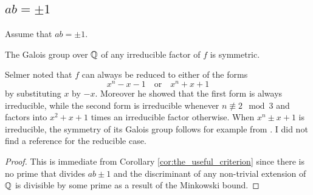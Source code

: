 \documentclass[../main.tex]{subfiles}
\begin{document}
\subsection{$a b = \pm 1$}
Assume that $ab = \pm 1$.
\begin{corollary}
  The Galois group over $\mathbb{Q}$ of any irreducible factor of $f$ is symmetric.
\end{corollary}
\begin{remark}
  Selmer \cite{SelmerIrreducibility1956} noted that $f$ can always be reduced to either of the forms 
  \[
    x^n - x - 1 \quad \text{or} \quad x^n + x + 1 
  \]
  by substituting $x$ by $-x$.
  Moreover he showed that the first form is always irreducible, while the second form is irreducible whenever $n \not \equiv 2 \mod 3$ and factors into $x^2 + x + 1$ times an irreducible factor otherwise.
  When $x^n \pm x + 1$ is irreducible, the symmetry of its Galois group follows for example from \cite[Theorem 1]{Osada1987TheGG}.
  I did not find a reference for the reducible case.
\end{remark}
\begin{proof}
  This is immediate from Corollary \ref{cor:the_useful_criterion} since there is no prime that divides $a b \pm 1$ and the discriminant of any non-trivial extension of $\mathbb{Q}$ is divisible by some prime as a result of the Minkowski bound.
\end{proof}


\end{document}
